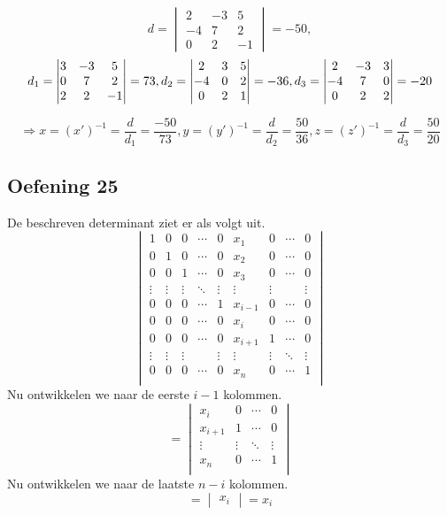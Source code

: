 \documentclass[lineaire_algebra_oplossingen.tex]{subfiles}
\begin{document}
\[  d = \begin{vmatrix}
            2 & -3 & 5\\
            -4 & 7 & 2\\
            0 & 2 & -1
    \end{vmatrix} = -50,\]
\[  d_1 = \begin{vmatrix}
        3 & -3 & 5\\
        0 & 7 & 2\\
        2 & 2 & -1
    \end{vmatrix} = 73,\\
    d_2 = \begin{vmatrix}
        2 & 3 & 5\\
        -4 & 0 & 2\\
        0 & 2 & 1
    \end{vmatrix} = -36,\\
    d_3 = \begin{vmatrix}
        2 & -3 & 3\\
        -4 & 7 & 0\\
        0 & 2 & 2
    \end{vmatrix} = -20
\]

\[\Rightarrow x = (x')^{-1}= \frac{d}{d_1} = \frac{-50}{73},
    y = (y')^{-1}= \frac{d}{d_2} = \frac{50}{36},
    z = (z')^{-1}= \frac{d}{d_3} = \frac{50}{20}
\]

\subsection{Oefening 25}
De beschreven determinant ziet er als volgt uit.
\[
\begin{vmatrix}
1 & 0 & 0 & \cdots & 0 & x_1 & 0 & \cdots & 0 \\
0 & 1 & 0 & \cdots & 0 & x_2 & 0 & \cdots & 0 \\
0 & 0 & 1 & \cdots & 0 & x_3 & 0 & \cdots & 0 \\
\vdots & \vdots & \vdots & \ddots  & \vdots & \vdots & \vdots &  & \vdots\\
0 & 0 & 0 & \cdots & 1 & x_{i-1} & 0 &\cdots & 0 \\
0 & 0 & 0 & \cdots & 0 & x_i & 0 & \cdots & 0 \\
0 & 0 & 0 & \cdots & 0 & x_{i+1} & 1 & \cdots & 0 \\
\vdots & \vdots & \vdots &  & \vdots & \vdots & \vdots & \ddots & \vdots\\
0 & 0 & 0 & \cdots & 0 & x_n & 0 & \cdots & 1\\
\end{vmatrix}
\]
Nu ontwikkelen we naar de eerste $i-1$ kolommen.
\[
= 
\begin{vmatrix}
x_i & 0 & \cdots & 0 \\
x_{i+1} & 1 & \cdots & 0 \\
\vdots & \vdots & \ddots & \vdots\\
 x_n & 0 & \cdots & 1\\
\end{vmatrix}
\]
Nu ontwikkelen we naar de laatste $n -i$ kolommen.
\[
= 
\begin{vmatrix}
x_i
\end{vmatrix}
= x_i
\]
\end{document}

